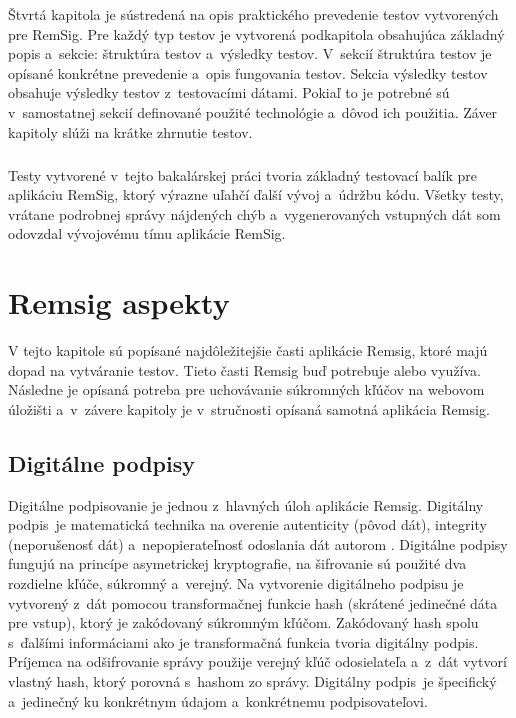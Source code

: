 \documentclass[
  digital, %
  table,   %
oneside,
  nolof,     %
  nolot,     %
]{fithesis3}
\begin{document}
Štvrtá kapitola je sústredená na opis praktického prevedenie testov vytvorených pre RemSig. Pre každý typ testov je vytvorená podkapitola obsahujúca základný popis a~sekcie: štruktúra testov a~výsledky testov. V~sekcií štruktúra testov je opísané konkrétne prevedenie a~opis fungovania testov. Sekcia výsledky testov obsahuje výsledky testov z~testovacími dátami. Pokiaľ to je potrebné sú v~samostatnej sekcií definované použité technológie a~dôvod ich použitia. Záver kapitoly slúži na krátke zhrnutie testov.\paragraph{}
Testy vytvorené v~tejto bakalárskej práci tvoria základný testovací balík pre aplikáciu RemSig, ktorý výrazne uľahčí ďalší vývoj a~údržbu kódu. Všetky testy, vrátane podrobnej správy nájdených chýb a~vygenerovaných vstupných dát som odovzdal vývojovému tímu aplikácie RemSig.
\chapter{Remsig aspekty}
V tejto kapitole sú popísané najdôležitejšie časti aplikácie Remsig, ktoré majú dopad na vytváranie testov. Tieto časti Remsig buď potrebuje alebo využíva. Následne je opísaná potreba pre uchovávanie súkromných kľúčov na webovom úložišti a~v~závere kapitoly je v~stručnosti opísaná samotná aplikácia Remsig.
\section{Digitálne podpisy}
Digitálne podpisovanie je jednou z~hlavných úloh aplikácie Remsig. Digitálny podpis~je matematická technika na overenie autenticity (pôvod dát), integrity (neporušenosť dát) a~nepopierateľnosť odoslania dát autorom \cite{digitalSignature}.  Digitálne podpisy fungujú na princípe asymetrickej kryptografie, na šifrovanie sú použité dva rozdielne kľúče, súkromný a~verejný.
Na vytvorenie digitálneho podpisu je vytvorený z~dát pomocou transformačnej funkcie  hash (skrátené jedinečné dáta pre vstup), ktorý je zakódovaný súkromným kľúčom. Zakódovaný hash spolu s~ďalšími informáciami ako je transformačná funkcia tvoria digitálny podpis. Príjemca na odšifrovanie správy použije verejný kľúč odosielateľa a~z~dát vytvorí vlastný hash, ktorý porovná s~hashom zo správy. Digitálny podpis~je špecifický a~jedinečný ku konkrétnym údajom a~konkrétnemu podpisovateľovi.
\end{document}
